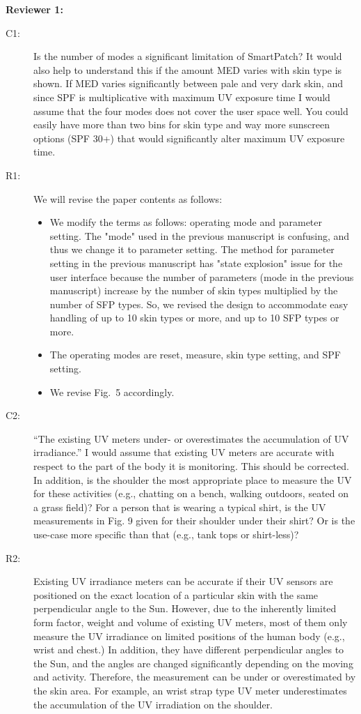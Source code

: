 \documentclass[onecolumn]{IEEEconf}
\begin{document}
\textbf{Reviewer 1:}
\begin{description}
\item [C1: ] Is the number of modes a significant limitation of SmartPatch? It would also help to understand this if the amount MED varies with skin type is shown. If MED varies significantly between pale and very dark skin, and since SPF is multiplicative with maximum UV exposure time I would assume that the four modes does not cover the user space well. You could easily have more than two bins for skin type and way more sunscreen options (SPF 30+) that would significantly alter maximum UV exposure time.  
\item [R1: ] We will revise the paper contents as follows:
\begin{itemize}
\item We modify the terms as follows: operating mode and parameter setting.  The "mode" used in the previous manuscript is confusing, and thus we change it to parameter setting. The method for parameter setting in the previous manuscript has "state explosion" issue for the user interface because the number of parameters (mode in the previous manuscript) increase by the number of skin types multiplied by the number of SFP types. So, we revised the design to accommodate easy handling of up to 10 skin types or more, and up to 10 SFP types or more.
\item The operating modes are reset, measure, skin type setting, and SPF setting.
\item We revise Fig.~5 accordingly.
\end{itemize}
\item [C2: ] ``The existing UV meters under- or overestimates the accumulation of UV irradiance.'' I would assume that existing UV meters are accurate with respect to the part of the body it is monitoring. This should be corrected. In addition, is the shoulder the most appropriate place to measure the UV for these activities (e.g., chatting on a bench, walking outdoors, seated on a grass field)? For a person that is wearing a typical shirt, is the UV measurements in Fig. 9 given for their shoulder under their shirt? Or is the use-case more specific than that (e.g., tank tops or shirt-less)?
\item [R2: ] 
Existing UV irradiance meters can be accurate if their UV sensors are positioned on the exact location of a particular skin with the same perpendicular angle to the Sun. However, due to the inherently limited form factor, weight and volume of existing UV meters, most of them only measure the UV irradiance on limited positions of the human body (e.g., wrist and chest.) In addition, they have different perpendicular angles to the Sun, and the angles are changed significantly depending on the moving and activity. Therefore, the measurement can be under or overestimated by the skin area. For example, an wrist strap type UV meter underestimates the accumulation of the UV irradiation on the shoulder.\\ 
~\\


\end{description}
\end{document}
